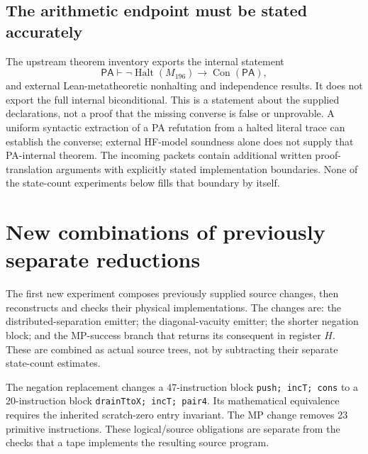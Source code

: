 \subsection{The arithmetic endpoint must be stated accurately}

The upstream theorem inventory exports the internal statement
\[
\mathsf{PA}\vdash\neg\operatorname{Halt}(M_{196})
   \longrightarrow\operatorname{Con}(\mathsf{PA}),
\]
and external Lean-metatheoretic nonhalting and independence results.
It does not export the full internal biconditional. This is a statement
about the supplied declarations, not a proof that the missing converse
is false or unprovable. A uniform syntactic extraction of a PA refutation
from a halted literal trace can establish the converse; external
HF-model soundness alone does not supply that PA-internal theorem.
The incoming packets contain additional written proof-translation
arguments with explicitly stated implementation boundaries. None of the
state-count experiments below fills that boundary by itself.

\section{New combinations of previously separate reductions}

The first new experiment composes previously supplied source changes,
then reconstructs and checks their physical implementations. The changes
are: the distributed-separation emitter; the diagonal-vacuity emitter;
the shorter negation block; and the MP-success branch that returns its
consequent in register $H$. These are combined as actual source trees,
not by subtracting their separate state-count estimates.

The negation replacement changes a 47-instruction block
\texttt{push; incT; cons} to a 20-instruction block
\texttt{drainTtoX; incT; pair4}. Its mathematical equivalence requires
the inherited scratch-zero entry invariant. The MP change removes 23
primitive instructions. These logical/source obligations are separate
from the checks that a tape implements the resulting source program.

